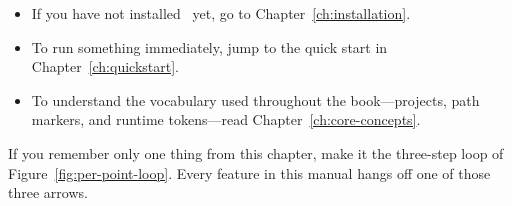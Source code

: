 \begin{itemize}
  \item If you have not installed \Jarvis\ yet, go to Chapter~\ref{ch:installation}.
  \item To run something immediately, jump to the quick start in
        Chapter~\ref{ch:quickstart}.
  \item To understand the vocabulary used throughout the book---projects, path markers, and
        runtime tokens---read Chapter~\ref{ch:core-concepts}.
\end{itemize}

\begin{jtip}
If you remember only one thing from this chapter, make it the three-step loop of
Figure~\ref{fig:per-point-loop}. Every feature in this manual hangs off one of those three
arrows.
\end{jtip}
